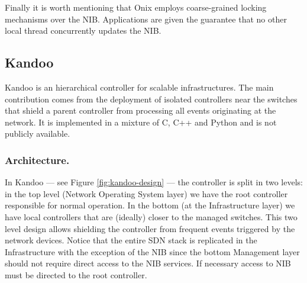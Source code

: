 \begin{itemize}
Finally it is worth mentioning that Onix employs coarse-grained
locking mechanisms over the NIB. Applications are given the guarantee
that no other local thread concurrently updates the NIB. 

\subsection{Kandoo}
Kandoo \cite{Yeganeh:2012jm} is an hierarchical controller for
scalable infrastructures. The main
contribution comes from the deployment of isolated controllers near
the switches that shield a parent  controller from processing all
events originating at the network. It is implemented in a mixture of
C, C++ and Python and is not publicly available. 

\subsubsection{Architecture.} In Kandoo --- see Figure  \ref{fig:kandoo-design} --- the controller is split in two levels: in the top level (Network Operating System layer) we
have the root controller responsible for normal operation. In the
bottom (at the Infrastructure layer) we have local controllers that are (ideally)  closer to the
managed switches. This two level design allows  shielding the
controller from frequent events triggered by 
the network devices. Notice that  the entire SDN
stack is replicated in the Infrastructure with the exception of the
NIB since the bottom Management layer should not require direct access to the NIB services. If necessary access to NIB
must be directed to the root controller.


\end{itemize}
